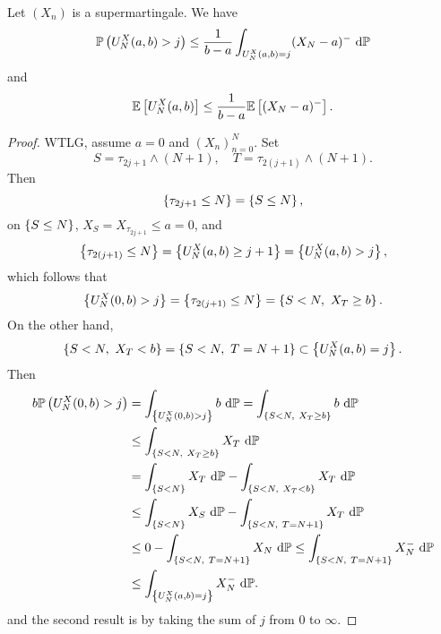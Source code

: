 \begin{thm}
    Let $(X_n)$ is a supermartingale. We have
    \begin{equation*}
        \mathbb{P}\left(U_N^X(a,b) > j\right) \leq \frac{1}{b-a} \int_{U_N^X(a,b) = j} (X_N -a)^- ~\mathrm{d}\mathbb{P}
    \end{equation*}
    and
    \begin{equation*}
        \mathbb{E}\left[U_N^X(a,b)\right] \leq \frac{1}{b-a} \mathbb{E}\left[(X_N -a)^-\right].
    \end{equation*}
\end{thm}
\begin{proof}
    WTLG, assume $a = 0$ and $(X_n)_{n=0}^N$. Set
    \begin{equation*}
        S = \tau_{2j+1} \wedge (N+1),\quad T = \tau_{2(j+1)} \wedge (N+1).
    \end{equation*}
    Then 
    \begin{equation*}
        \left\{\tau_{2j+1} \leq N\right\} = \left\{S \leq N\right\},
    \end{equation*}
    on $\left\{S \leq N\right\}$, $X_S = X_{\tau_{2j+1}} \leq a = 0$, and 
    \begin{equation*}
        \left\{\tau_{2(j+1)} \leq N\right\} = \left\{U_N^X(a,b) \geq j+1\right\} = \left\{U_N^X(a,b) > j\right\},
    \end{equation*}
    which follows that
    \begin{equation*}
        \left\{U_N^X(0,b) > j\right\} = \left\{\tau_{2(j+1)} \leq N\right\} = \left\{S < N,~X_T \geq b\right\}.
    \end{equation*}
    On the other hand,
    \begin{equation*}
        \left\{S < N,~X_T < b\right\} = \left\{S < N,~T = N+1\right\} \subset \left\{U_N^X(a,b) = j\right\}.
    \end{equation*}
    Then
    \begin{equation*}
        \begin{aligned}
            b\mathbb{P}\left(U_N^X(0,b) > j\right) &= \int_{\left\{U_N^X(0,b) > j\right\}} b ~\mathrm{d}\mathbb{P}  = \int_{\left\{S < N,~X_T \geq b\right\}} b ~\mathrm{d}\mathbb{P} \\
            &\leq \int_{\left\{S < N,~X_T \geq b\right\}} X_T ~\mathrm{d}\mathbb{P} \\
            &= \int_{\left\{S < N\right\}} X_T ~\mathrm{d}\mathbb{P} - \int_{\left\{S < N,~X_T < b\right\}} X_T ~\mathrm{d}\mathbb{P}\\
            &\leq \int_{\left\{S < N\right\}} X_S ~\mathrm{d}\mathbb{P} - \int_{\left\{S < N,~T = N+1\right\}} X_T ~\mathrm{d}\mathbb{P}\\
            &\leq 0 - \int_{\left\{S < N,~T = N+1\right\}} X_N ~\mathrm{d}\mathbb{P} \leq \int_{\left\{S < N,~T = N+1\right\}} X_N^- ~\mathrm{d}\mathbb{P} \\
            &\leq \int_{\left\{U_N^X(a,b) = j\right\}} X_N^- ~\mathrm{d}\mathbb{P}.
        \end{aligned}
    \end{equation*}
    and the second result is by taking the sum of $j$ from $0$ to $\infty$.
\end{proof}

